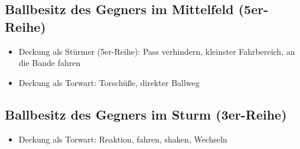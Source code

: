 \subsection{Ballbesitz des Gegners im Mittelfeld (5er-Reihe)}
\label{technik:defensive:gegnermittelfeld}

\begin{itemize}
\item Deckung als Stürmer (5er-Reihe): Pass verhindern, kleinster Fahrbereich, an die Bande fahren
\item Deckung als Torwart: Torschüße, direkter Ballweg
\end{itemize}


\subsection{Ballbesitz des Gegners im Sturm (3er-Reihe)}
\label{technik:defensive:gegnersturm}

\begin{itemize}
\item Deckung als Torwart: Reaktion, fahren, shaken, Wechseln
\end{itemize}

